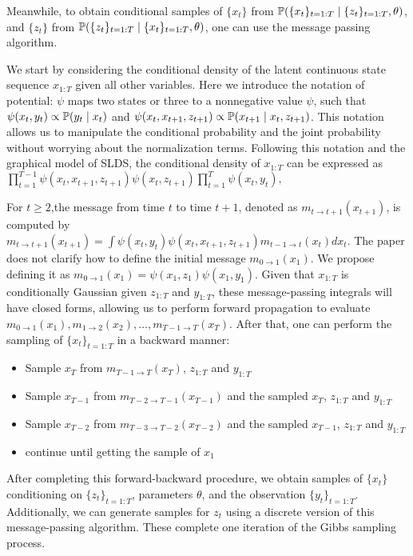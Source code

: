 Meanwhile, to obtain conditional samples of $\{x_t\}$ from $\mathbb{P}(\{x_{t}\}_{t=1:T} \mid \{z_t\}_{t=1:T}, \theta)$, and $\{z_t\}$ from $\mathbb{P}(\{z_{t}\}_{t=1:T} \mid \{x_t\}_{t=1:T}, \theta)$, one can use the message passing algorithm.

We start by considering the conditional density of the latent continuous state sequence $x_{1:T}$ given all other variables. Here we introduce the notation of potential: $\psi$ maps two states or three to a nonnegative value $\psi$, such that $\psi(x_t,y_t)\propto \mathbb{P}(y_t \mid x_t)$ and $\psi(x_t,x_{t+1},z_{t+1})\propto \mathbb{P}(x_{t+1} \mid x_t,z_{t+1})$. This notation allows us to manipulate the conditional probability and the joint probability without worrying about the normalization terms. Following this notation and the graphical model of SLDS, the conditional density of $x_{1:T}$ can be expressed as $
\prod_{t=1}^{T-1} \psi\left(x_{t}, x_{t+1}, z_{t+1}\right) \psi\left(x_{t}, z_{t+1}\right) \prod_{t=1}^{T} \psi\left(x_{t}, y_{t}\right),
$

 
For $t\geq 2$,the message from time $t$ to time $t+1$, denoted as $m_{t \rightarrow t+1}(x_{t+1})$, is computed by 
$ m_{t \rightarrow t+1}(x_{t+1})=\int \psi(x_t,y_t) \psi(x_t,x_{t+1},z_{t+1}) m_{t-1 \rightarrow t}(x_t) dx_t $. The paper does not clarify how to define the initial message $m_{0 \rightarrow 1}(x_1)$. We propose defining it as $m_{0 \rightarrow 1}(x_1)=\psi\left(x_{1}, z_{1}\right) \psi\left(x_{1}, y_{1}\right)$. Given that $x_{1:T}$ is conditionally Gaussian given $z_{1:T}$ and $y_{1:T}$, these message-passing integrals will have closed forms, allowing us to perform forward propagation to evaluate $m_{0 \rightarrow 1}(x_1), m_{1 \rightarrow 2}(x_2),\dots, m_{T-1 \rightarrow T}(x_T)$. After that, one can perform the sampling of $\{x_t\}_{t=1:T}$ in a backward manner: 
\begin{itemize}
  \item Sample $x_T$ from $m_{T-1 \rightarrow T}(x_T)$, $z_{1:T}$ and $y_{1:T}$
  \item Sample $x_{T-1}$ from $m_{T-2 \rightarrow T-1}(x_{T-1})$ and the sampled $x_T$, $z_{1:T}$ and $y_{1:T}$
  \item Sample $x_{T-2}$ from $m_{T-3 \rightarrow T-2}(x_{T-2})$ and the sampled $x_{T-1}$, $z_{1:T}$ and $y_{1:T}$
  \item continue until getting the sample of $x_1$
\end{itemize}
After completing this forward-backward procedure, we obtain samples of $\{x_t\}$ conditioning on $\{z_t\}_{t=1:T}$, parameters $\theta$, and the observation $\{y_t\}_{t=1:T}$. Additionally, we can generate samples for $z_t$ using a discrete version of this message-passing algorithm. These complete one iteration of the Gibbs sampling process.


